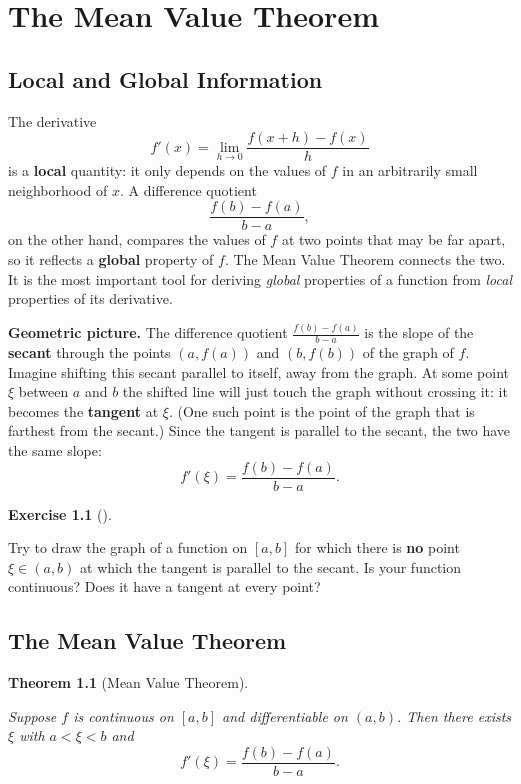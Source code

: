 \documentclass[
  letterpaper,
  DIV=11,
  numbers=noendperiod]{scrreprt}
\theoremstyle{plain}
\theoremstyle{plain}
\theoremstyle{definition}
\theoremstyle{definition}
\newtheorem{exercise}{Exercise}[chapter]
\theoremstyle{definition}
\theoremstyle{plain}
\newtheorem{theorem}{Theorem}[chapter]
\theoremstyle{plain}
\theoremstyle{remark}
\begin{document}
\chapter{The Mean Value Theorem}\label{the-mean-value-theorem}

\section{Local and Global
Information}\label{local-and-global-information}

The derivative \[
f'(x) = \lim_{h\to0}\frac{f(x+h)-f(x)}{h}
\] is a \textbf{local} quantity: it only depends on the values of \(f\)
in an arbitrarily small neighborhood of \(x\). A difference quotient \[
\frac{f(b)-f(a)}{b-a},
\] on the other hand, compares the values of \(f\) at two points that
may be far apart, so it reflects a \textbf{global} property of \(f\).
The Mean Value Theorem connects the two. It is the most important tool
for deriving \emph{global} properties of a function from \emph{local}
properties of its derivative.

\textbf{Geometric picture.} The difference quotient
\(\frac{f(b)-f(a)}{b-a}\) is the slope of the \textbf{secant} through
the points \((a,f(a))\) and \((b,f(b))\) of the graph of \(f\). Imagine
shifting this secant parallel to itself, away from the graph. At some
point \(\xi\) between \(a\) and \(b\) the shifted line will just touch
the graph without crossing it: it becomes the \textbf{tangent} at
\(\xi\). (One such point is the point of the graph that is farthest from
the secant.) Since the tangent is parallel to the secant, the two have
the same slope: \[
f'(\xi) = \frac{f(b)-f(a)}{b-a}.
\]

\begin{exercise}[]\protect\hypertarget{exr-mvt-fails}{}\label{exr-mvt-fails}

Try to draw the graph of a function on \([a,b]\) for which there is
\textbf{no} point \(\xi\in(a,b)\) at which the tangent is parallel to
the secant. Is your function continuous? Does it have a tangent at every
point?

\end{exercise}

\section{The Mean Value Theorem}\label{the-mean-value-theorem-1}

\begin{theorem}[Mean Value
Theorem]\protect\hypertarget{thm-mvt}{}\label{thm-mvt}

Suppose \(f\) is continuous on \([a,b]\) and differentiable on
\((a,b)\). Then there exists \(\xi\) with \(a<\xi<b\) and \[
f'(\xi) = \frac{f(b)-f(a)}{b-a}.
\]

\end{theorem}
\end{document}
